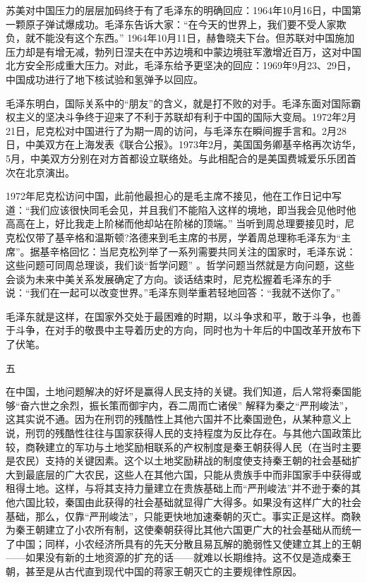 \documentclass[UTF8, 12pt, a4paper]{ctexrep}
\begin{document}
苏美对中国压力的层层加码终于有了毛泽东的明确回应：1964年10月16日，中国第一颗原子弹试爆成功。毛泽东告诉大家：“在今天的世界上，我们要不受人家欺负，就不能没有这个东西。” 1964年10月11日，赫鲁晓夫下台。但苏联对中国施加压力却是有增无减，勃列日涅夫在中苏边境和中蒙边境驻军激增近百万，这对中国北方安全形成重大压力。对此，毛泽东给予更坚决的回应：1969年9月23、29日，中国成功进行了地下核试验和氢弹予以回应。

毛泽东明白，国际关系中的“朋友”的含义，就是打不败的对手。毛泽东面对国际霸权主义的坚决斗争终于迎来了不利于苏联却有利于中国的国际大变局。1972年2月21日，尼克松对中国进行了为期一周的访问，与毛泽东在瞬间握手言和。2月28日，中美双方在上海发表《联合公报》。1973年2月，美国国务卿基辛格再次访华，5月，中美双方分别在对方首都设立联络处。与此相配合的是美国费城爱乐乐团首次在北京演出。

1972年尼克松访问中国，此前他最担心的是毛主席不接见，他在工作日记中写道：“我们应该很快同毛会见，并且我们不能陷入这样的境地，即当我会见他时他高高在上，好比我走上阶梯而他却站在阶梯的顶端。” 当听到周总理要接见时，尼克松仅带了基辛格和温斯顿?洛德来到毛主席的书房，学着周总理称毛泽东为“主席”。据基辛格回忆：当尼克松列举了一系列需要共同关注的国家时，毛泽东说：这些问题可同周总理谈，我们谈“哲学问题” 。哲学问题当然就是方向问题，这些会谈为未来中美关系发展确定了方向。谈话结束时，尼克松握着毛泽东的手说：“我们在一起可以改变世界。”毛泽东则举重若轻地回答：“我就不送你了。”

毛泽东就是这样，在国家外交处于最困难的时期，以斗争求和平，敢于斗争，也善于斗争，在对手的敬畏中主导着历史的方向，同时也为十年后的中国改革开放布下了伏笔。

五

在中国，土地问题解决的好坏是赢得人民支持的关键。我们知道，后人常将秦国能够“奋六世之余烈，振长策而御宇内，吞二周而亡诸侯” 解释为秦之“严刑峻法”，这其实说不通。因为在刑罚的残酷性上其他六国并不比秦国逊色，从某种意义上说，刑罚的残酷性往往与国家获得人民的支持程度为反比存在。与其他六国政策比较，商鞅建立的军功与土地奖励相联系的产权制度是秦王朝获得人民（在当时主要是农民）支持的关键因素。这个以土地奖励耕战的制度使支持秦王朝的社会基础扩大到最底层的广大农民，这些人在其他六国，只能从贵族手中而非国家手中获得或租得土地。这样，与将其支持力量建立在贵族基础上而“严刑峻法”并不逊于秦的其他六国比较，秦国由此获得的社会基础就显得广大得多。如果没有这样广大的社会基础，那么，仅靠“严刑峻法”，只能更快地加速秦朝的灭亡。事实正是这样。商鞅为秦王朝建立了小农所有制，这使秦朝获得比其他六国更广大的社会基础从而统一了中国；同样，小农经济所具有的先天分散且易瓦解的脆弱性又使建立其上的王朝——如果没有新的土地资源的扩充的话——就难以长期维持。这不仅是造成秦王朝，甚至是从古代直到现代中国的蒋家王朝灭亡的主要规律性原因。
\end{document}
